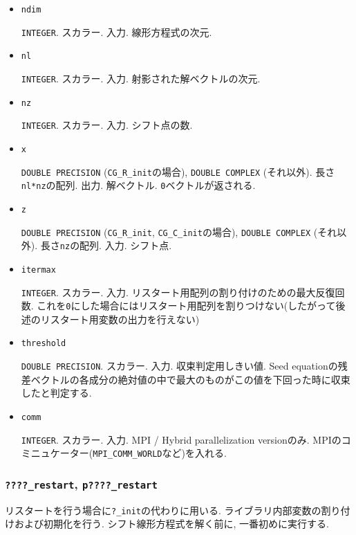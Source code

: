 \documentclass[12pt,titlepage]{article}
\begin{document}
\begin{itemize}

\item \verb|ndim|

  \verb|INTEGER|. スカラー. 入力. 線形方程式の次元.

\item \verb|nl|

  \verb|INTEGER|. スカラー. 入力. 射影された解ベクトルの次元.

\item \verb|nz|

  \verb|INTEGER|. スカラー. 入力. シフト点の数.

\item \verb|x|

  \verb|DOUBLE PRECISION| (\verb|CG_R_init|の場合),
  \verb|DOUBLE COMPLEX| (それ以外).
  長さ \verb|nl*nz|の配列. 出力.
  解ベクトル. \verb|0|ベクトルが返される.

\item \verb|z|

  \verb|DOUBLE PRECISION| (\verb|CG_R_init|, \verb|CG_C_init|の場合),
  \verb|DOUBLE COMPLEX| (それ以外).
  長さ\verb|nz|の配列. 入力. シフト点.

\item \verb|itermax|

  \verb|INTEGER|. スカラー. 入力. リスタート用配列の割り付けのための最大反復回数.
  これを\verb|0|にした場合にはリスタート用配列を割りつけない(したがって後述のリスタート用変数の出力を行えない)

\item \verb|threshold|

  \verb|DOUBLE PRECISION|. スカラー. 入力. 収束判定用しきい値.
  Seed equationの残差ベクトルの各成分の絶対値の中で最大のものがこの値を下回った時に収束したと判定する.

\item \verb|comm|

  \verb|INTEGER|. スカラー. 入力. MPI / Hybrid parallelization versionのみ.
  MPIのコミニュケーター(\verb|MPI_COMM_WORLD|など)を入れる.

\end{itemize}

\subsubsection{\texttt{????\_restart}, \texttt{p????\_restart}}

  リスタートを行う場合に\verb|?_init|の代わりに用いる.
  ライブラリ内部変数の割り付けおよび初期化を行う.
  シフト線形方程式を解く前に, 一番初めに実行する.
\end{document}
